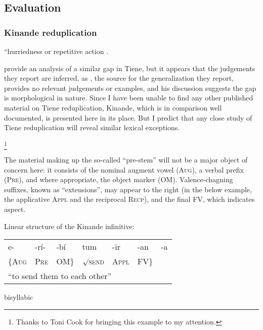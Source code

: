 \subsection{Evaluation}



\citet{Orgun1999}
\citet{Orgun2009}

\citet{Ito1989b}

\subsubsection{Kinande reduplication}

``hurriedness or repetitive action \citep[][85; henceforth, MH]{Mutaka1990}.

\citet{Orgun1999} provide an analysis of a similar gap in Tiene, but it appears that the judgements they report are inferred, as \citet{Ellington1977}, the source for the generalization they report, provides no relevant judgements or examples, and his discussion suggests the gap is morphological in nature.
Since I have been unable to find any other published material on Tiene reduplication, Kinande, which is in comparison well documented, is presented here in its place.
But I predict that any close study of Tiene reduplication will reveal similar lexical exceptions.

\footnote{Thanks to Toni Cook for bringing this example to my attention.}

The material making up the so-called ``pre-stem'' will not be a major object of concern here: it consists of the nominal augment vowel (\textsc{Aug}), a verbal prefix (\textsc{Pre}), and where appropriate, the object marker (\textsc{OM}). Valence-chagning suffixes, known as ``extensions'', may appear to the right (in the below example, the applicative \textsc{Appl} and the reciprocal \textsc{Recp}), and the final \textsc{FV}, which indicates aspect. 

\ex Linear structure of the Kinande infinitive: \\
\begin{tabular}{l l l l l l l}
e- & -rí- & -bí & tum & -ir & -an & -a \\
\{\textsc{Aug} & \textsc{Pre} & \textsc{OM}\} & $\surd$\textsc{send} & \textsc{Appl} & \textsc{FV}\} \\
\multicolumn{7}{l}{``to send them to each other''}
\end{tabular}
\xe

bisyllabic
\citet{Downing2000}

